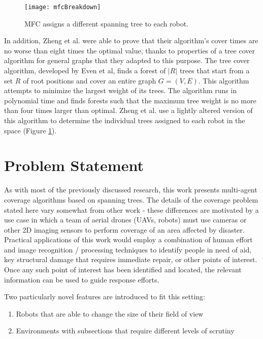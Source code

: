\begin{figure}[H]
\texttt{[image: mfcBreakdown]}
\caption[Multi-Robot Forest Coverage Path Creation]{MFC assigns a different spanning tree to each robot.}
\label {fig:MRCPaths}
\end{figure}

In addition, Zheng et al. were able to prove that their algorithm's cover times are no worse than eight times the optimal value, thanks to properties of a tree cover algorithm for general graphs that they adapted to this purpose. The tree cover algorithm, developed by Even et al, finds a forest of $|R|$ trees that start from a set $R$ of root positions and cover an entire graph $G = (V, E)$. This algorithm attempts to minimize the largest weight of its trees. The algorithm runs in polynomial time and finds forests such that the maximum tree weight is no more than four times larger than optimal. Zheng et al. use a lightly altered version of this algorithm to determine the individual trees assigned to each robot in the space (Figure \ref{fig:MRCPaths}). 

\section{Problem Statement}

As with most of the previously discussed research, this work presents multi-agent coverage algorithms based on spanning trees. The details of the coverage problem stated here vary somewhat from other work - these differences are motivated by a use case in which a team of aerial drones (UAVs, robots) must use cameras or other 2D imaging sensors to perform coverage of an area affected by disaster. Practical applications of this work would employ a combination of human effort and image recognition / processing techniques to identify people in need of aid, key structural damage that requires immediate repair, or other points of interest. Once any such point of interest has been identified and located, the relevant information can be used to guide response efforts.

Two particularly novel features are introduced to fit this setting:
\begin{enumerate}
	\item Robots that are able to change the size of their field of view
	\item Environments with subsections that require different levels of scrutiny
\end{enumerate}

